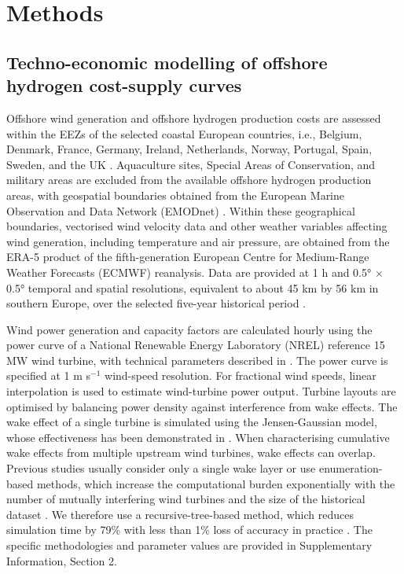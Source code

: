 \documentclass[pdflatex,sn-mathphys,Numbered]{sn-jnl}%
\begin{document}
\section{Methods}\label{sec11}

\subsection{Techno-economic modelling of offshore hydrogen cost-supply curves}

Offshore wind generation and offshore hydrogen production costs are assessed within the EEZs of the selected coastal European countries, i.e., Belgium, Denmark, France, Germany, Ireland, Netherlands, Norway, Portugal, Spain, Sweden, and the UK \cite{Marineregions}. Aquaculture sites, Special Areas of Conservation, and military areas are excluded from the available offshore hydrogen production areas, with geospatial boundaries obtained from the European Marine Observation and Data Network (EMODnet) \cite{EMODnet}.
Within these geographical boundaries, vectorised wind velocity data and other weather variables affecting wind generation, including temperature and air pressure, are obtained from the ERA-5 product of the fifth-generation European Centre for Medium-Range Weather Forecasts (ECMWF) reanalysis. Data are provided at 1 h and 0.5° $\times$ 0.5° temporal and spatial resolutions, equivalent to about 45 km by 56 km in southern Europe, over the selected five-year historical period \cite{ERA5}.

Wind power generation and capacity factors are calculated hourly using the power curve of a National Renewable Energy Laboratory (NREL) reference 15 MW wind turbine, with technical parameters described in \cite{musial2019oregon}. The power curve is specified at 1 m s$^{-1}$ wind-speed resolution. For fractional wind speeds, linear interpolation is used to estimate wind-turbine power output.
Turbine layouts are optimised by balancing power density against interference from wake effects. The wake effect of a single turbine is simulated using the Jensen-Gaussian model, whose effectiveness has been demonstrated in \cite{tao2019optimal}.
When characterising cumulative wake effects from multiple upstream wind turbines, wake effects can overlap. Previous studies usually consider only a single wake layer or use enumeration-based methods, which increase the computational burden exponentially with the number of mutually interfering wind turbines and the size of the historical dataset \cite{paul2019multi, tao2020joint}. We therefore use a recursive-tree-based method, which reduces simulation time by 79\% with less than 1\% loss of accuracy in practice \cite{Figshare}.
The specific methodologies and parameter values are provided in Supplementary Information, Section 2.
\end{document}
